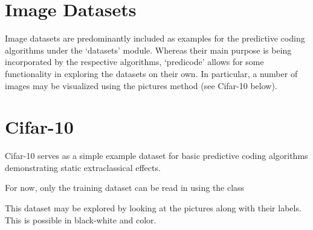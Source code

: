\documentclass[letterpaper,10pt,english]{sphinxmanual}
\begin{document}
\section{Image Datasets}
\label{\detokenize{usage/datasets:Image-Datasets}}
Image datasets are predominantly included as examples for the predictive coding algorithms under the ‘datasets’ module. Whereas their main purpose is being incorporated by the respective algorithms, ‘predicode’ allows for some functionality in exploring the datasets on their own. In particular, a number of images may be visualized using the pictures method (see Cifar-10 below).


\section{Cifar-10}
\label{\detokenize{usage/datasets:Cifar-10}}
Cifar-10 serves as a simple example dataset for basic predictive coding algorithms demonstrating static extraclassical effects.

For now, only the training dataset can be read in using the class 

{
\begin{sphinxVerbatim}[commandchars=\\\{\}]
\llap{\color{nbsphinxin}[1]:\,\hspace{\fboxrule}\hspace{\fboxsep}}   
  
\end{sphinxVerbatim}
}

This dataset may be explored by looking at the pictures along with their labels. This is possible in black-white and color.

{
\begin{sphinxVerbatim}[commandchars=\\\{\}]
\llap{\color{nbsphinxin}[2]:\,\hspace{\fboxrule}\hspace{\fboxsep}}     
\end{sphinxVerbatim}
}
\end{document}
